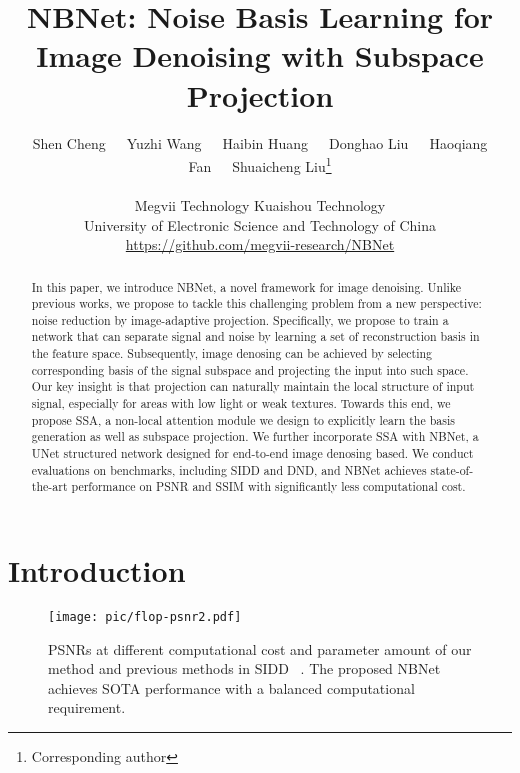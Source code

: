 \documentclass[final]{cvpr}
\begin{document}
\title{NBNet: Noise Basis Learning for Image Denoising with Subspace Projection}

\author{
    Shen Cheng\ \ \ Yuzhi Wang\ \ \ Haibin Huang\ \ \ Donghao Liu\ \ \ Haoqiang Fan\ \ \ Shuaicheng Liu\thanks {Corresponding author}
	\\
	\\
    Megvii Technology \quad  Kuaishou Technology \\
    University of Electronic Science and Technology of China \\
    \url{https://github.com/megvii-research/NBNet}
}





\maketitle
\thispagestyle{empty}
\begin{abstract}
   In this paper, we introduce NBNet, a novel framework for image denoising. Unlike previous works, we propose to tackle this challenging problem from a new perspective: noise reduction by image-adaptive projection. Specifically, we propose to train a network that can separate signal and noise by learning a set of reconstruction basis in the feature space. Subsequently, image denosing can be achieved by selecting corresponding basis of the signal subspace and projecting the input into such space. Our key insight is that projection can naturally maintain the local structure of input signal, especially for areas with low light or weak textures.  Towards this end,  we propose 
   SSA, a non-local attention module we design to explicitly learn the basis generation as well as subspace projection. We further incorporate SSA with NBNet, a UNet structured network designed for end-to-end image denosing based. We conduct evaluations on benchmarks, including SIDD and DND, and NBNet achieves state-of-the-art performance on PSNR and SSIM with significantly less computational cost.  
\end{abstract}

\section{Introduction}
\begin{figure}[t]
    \centering
    \texttt{[image: pic/flop-psnr2.pdf]}
    \caption{PSNRs at different computational cost and parameter amount of our method and previous methods in SIDD ~\cite{abdelhamed2018high}. The proposed NBNet achieves SOTA performance with a balanced computational requirement.}
    \label{fig:flop_psnr}
\end{figure}
\end{document}
